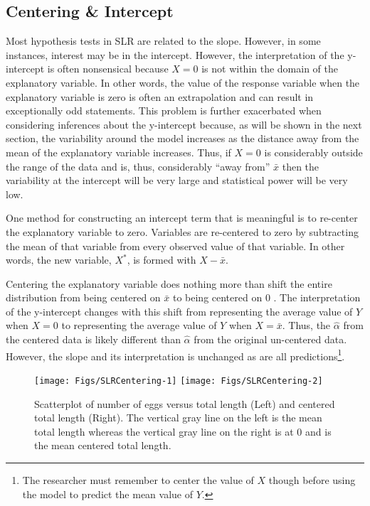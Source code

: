 \documentclass[10pt,openany]{book}\usepackage[]{graphicx}\usepackage[]{color}
\newenvironment{knitrout}{}{} %
\begin{document}
\subsection{Centering \& Intercept} \label{sect:SLRCentering}
Most hypothesis tests in SLR are related to the slope.  However, in some instances, interest may be in the intercept.  However, the interpretation of the y-intercept is often nonsensical because $X=0$ is not within the domain of the explanatory variable.  In other words, the value of the response variable when the explanatory variable is zero is often an extrapolation and can result in exceptionally odd statements.  This problem is further exacerbated when considering inferences about the y-intercept because, as will be shown in the next section, the variability around the model increases as the distance away from the mean of the explanatory variable increases.  Thus, if $X=0$ is considerably outside the range of the data and is, thus, considerably ``away from'' $\bar{x}$ then the variability at the intercept will be very large and statistical power will be very low.

One method for constructing an intercept term that is meaningful is to re-center the explanatory variable to zero.  Variables are re-centered to zero by subtracting the mean of that variable from every observed value of that variable.  In other words, the new variable, $X^{*}$, is formed with $X-\bar{x}$.

Centering the explanatory variable does nothing more than shift the entire distribution from being centered on $\bar{x}$ to being centered on $0$ .  The interpretation of the y-intercept changes with this shift from representing the average value of $Y$ when $X=0$ to representing the average value of $Y$ when $X=\bar{x}$.  Thus, the $\hat{\alpha}$ from the centered data is likely different than $\hat{\alpha}$ from the original un-centered data.  However, the slope and its interpretation is unchanged as are all predictions\footnote{The researcher must remember to center the value of $X$ though before using the model to predict the mean value of $Y$.}.

\begin{knitrout}
\color{fgcolor}\begin{figure}[h]

{\centering \texttt{[image: Figs/SLRCentering-1]} 
\texttt{[image: Figs/SLRCentering-2]} 

}

\caption[Scatterplot of number of eggs versus total length (Left) and centered total length (Right)]{Scatterplot of number of eggs versus total length (Left) and centered total length (Right). The vertical gray line on the left is the mean total length whereas the vertical gray line on the right is at 0 and is the mean centered total length.}\label{fig:SLRCentering}
\end{figure}


\end{knitrout}
\end{document}
